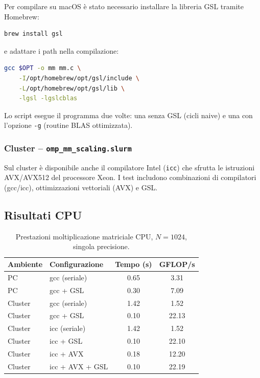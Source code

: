 \documentclass[a4paper,12pt]{article}
\begin{document}
Per compilare su macOS \`e stato necessario installare la libreria GSL tramite Homebrew:
\begin{lstlisting}[language=bash]
brew install gsl
\end{lstlisting}
e adattare i path nella compilazione:
\begin{lstlisting}[language=bash]
gcc $OPT -o mm mm.c \
    -I/opt/homebrew/opt/gsl/include \
    -L/opt/homebrew/opt/gsl/lib \
    -lgsl -lgslcblas
\end{lstlisting}

Lo script esegue il programma due volte: una senza GSL (cicli naive) e una con l'opzione \texttt{-g} (routine BLAS ottimizzata).

\subsubsection{Cluster -- \texttt{omp\_mm\_scaling.slurm}}

Sul cluster \`e disponibile anche il compilatore Intel (\texttt{icc}) che sfrutta le istruzioni AVX/AVX512 del processore Xeon. I test includono combinazioni di compilatori (gcc/icc), ottimizzazioni vettoriali (AVX) e GSL.

\subsection{Risultati CPU}

\begin{table}[H]
\centering
\begin{tabular}{llcc}
\toprule
\textbf{Ambiente} & \textbf{Configurazione} & \textbf{Tempo (s)} & \textbf{GFLOP/s} \\
\midrule
PC       & gcc (seriale)      & 0.65 & 3.31  \\
PC       & gcc + GSL          & 0.30 & 7.09  \\
\midrule
Cluster  & gcc (seriale)      & 1.42 & 1.52  \\
Cluster  & gcc + GSL          & 0.10 & 22.13 \\
Cluster  & icc (seriale)      & 1.42 & 1.52  \\
Cluster  & icc + GSL          & 0.10 & 22.10 \\
Cluster  & icc + AVX          & 0.18 & 12.20 \\
Cluster  & icc + AVX + GSL    & 0.10 & 22.19 \\
\bottomrule
\end{tabular}
\caption{Prestazioni moltiplicazione matriciale CPU, $N=1024$, singola precisione.}
\end{table}
\end{document}
